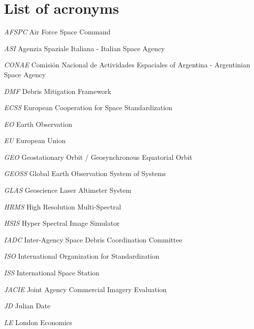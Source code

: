 \documentclass[12pt,a4paper,notitlepage,oneside,openright]{report}
\begin{document}







\newpage



\chapter*{List of acronyms}
\begin{abbrv}
\item[\textit{AFSPC}] Air Force Space Command
\item[\textit{ASI}] Agenzia Spaziale Italiana - Italian Space Agency
\item[\textit{CONAE}] Comisión Nacional de Actividades Espaciales of Argentina - \newline Argentinian Space Agency
\item[\textit{DMF}] Debris Mitigation Framework
\item[\textit{ECSS}] European Cooperation for Space Standardization
\item[\textit{EO}] Earth Observation
\item[\textit{EU}] European Union
\item[\textit{GEO}] Geostationary Orbit / Geosynchronous Equatorial Orbit
\item[\textit{GEOSS}] Global Earth Observation System of Systems
\item[\textit{GLAS}] Geoscience Laser Altimeter System
\item[\textit{HRMS}] High Resolution Multi-Spectral
\item[\textit{HSIS}] Hyper Spectral Image Simulator
\item[\textit{IADC}] Inter-Agency Space Debris Coordination Committee
\item[\textit{ISO}] International Organization for Standardization
\item[\textit{ISS}] International Space Station
\item[\textit{JACIE}] Joint Agency Commercial Imagery Evaluation
\item[\textit{JD}] Julian Date
\item[\textit{LE}] London Economics

\end{abbrv}
\end{document}
